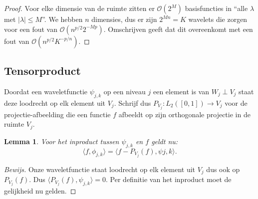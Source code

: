 \documentclass[11pt]{amsart}
\newtheorem*{lemma}{Lemma}
\begin{document}
\begin{proof}
Voor elke dimensie van de ruimte zitten er $\mathcal{O}(2^M)$ basisfuncties in ``alle $\lambda$ met $|\lambda| \leq M$''. We hebben $n$ dimensies, dus er zijn $2^{Mn} = K $ wavelets die zorgen voor een fout van $\mathcal{O}(n^{p/2} 2^{-Mp})$. Omschrijven geeft dat dit overeenkomt met een fout van $\mathcal{O}(n^{p/2} K^{-p/n})$.
\end{proof}

\subsection{Tensorproduct}
Doordat een waveletfunctie $\psi_{j,k}$ op een niveau $j$ een element is van $W_j \perp V_j$ staat deze loodrecht op elk element uit $V_j$.
Schrijf dus $P_{V_j} : L_2([0,1]) \rightarrow V_j$ voor de projectie-afbeelding die een
functie $f$ afbeeldt op zijn orthogonale projectie in de ruimte $V_j$.

\begin{lemma}
Voor het inproduct tussen $\psi_{j,k}$ en $f$ geldt nu:
\[
  \langle f , \phi_{j,k} \rangle = \langle f - P_{V_j}(f) , \psi{j,k} \rangle.
\]
\end{lemma}
\begin{proof}[Bewijs]
Onze waveletfunctie staat loodrecht op elk element uit $V_j$ dus ook op $P_{V_j}(f)$. Dus $\langle P_{V_j}(f), \psi_{j,k} \rangle = 0$. Per definitie van het inproduct moet de gelijkheid nu gelden.
\end{proof}
\end{document}
